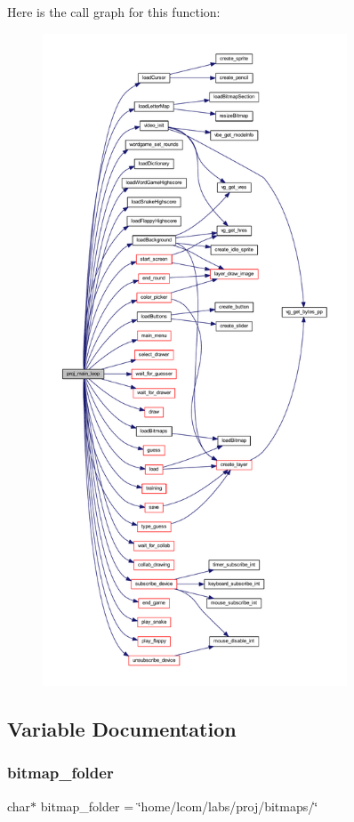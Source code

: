 Here is the call graph for this function\+:\nopagebreak
\begin{figure}[H]
\begin{center}
\leavevmode
\includegraphics[height=550pt]{group__proj_ga33bde23e0d2bbde847401c5ac6fb62e0_cgraph}
\end{center}
\end{figure}


\subsection{Variable Documentation}
\mbox{\label{group__proj_gaaf4b424c9c6851977bdc5db1af599155}} 
\subsubsection{\texorpdfstring{bitmap\+\_\+folder}{bitmap\_folder}}
{\footnotesize\ttfamily char$\ast$ bitmap\+\_\+folder = \char`\"{}home/lcom/labs/proj/bitmaps/\char`\"{}\hspace{0.3cm}{\ttfamily [static]}}

